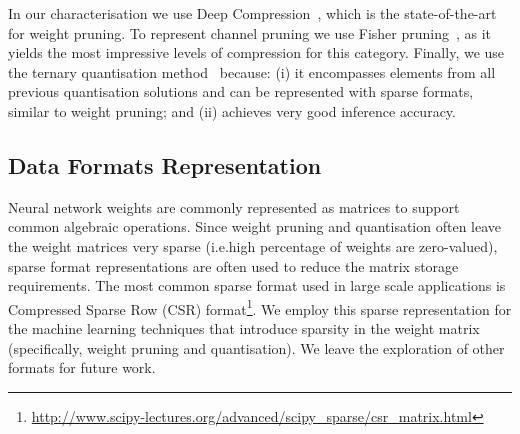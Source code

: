 \documentclass[conference]{IEEEtran}
\begin{document}
In our characterisation we use Deep Compression~\cite{han2015deep}, which is the state-of-the-art for weight pruning. To represent channel pruning we use Fisher pruning~\cite{theis2018faster,molchanov2016pruning}, as it yields the most impressive levels of compression for this category. Finally, we use the ternary quantisation method~\cite{zhu_2017_trained} because: (i) it encompasses elements from all previous quantisation solutions and can be represented with sparse formats, similar to weight pruning; and (ii) achieves very good inference accuracy.

\subsection{Data Formats Representation}

Neural network weights are commonly represented as matrices to support common algebraic operations. Since weight pruning and quantisation often leave the weight matrices very sparse (i.e.\a high percentage of weights are zero-valued), sparse format representations are often used to reduce the matrix storage requirements. The most common sparse format used in large scale applications is Compressed Sparse Row (CSR) format\footnote{\url{http://www.scipy-lectures.org/advanced/scipy_sparse/csr_matrix.html}}. We employ this sparse representation for the machine learning techniques that introduce sparsity in the weight matrix (specifically, weight pruning and quantisation). We leave the exploration of other formats for future work.
\end{document}
